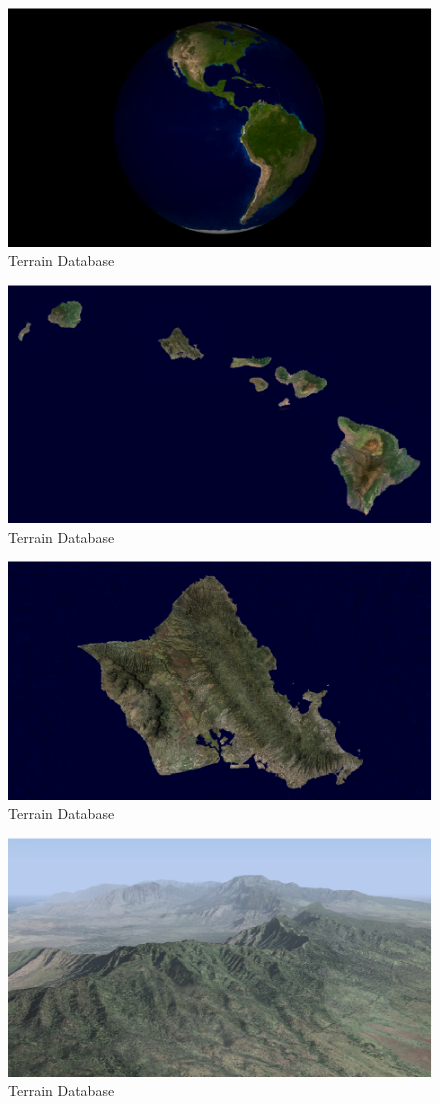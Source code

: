 \begin{figure}
  \centering
  \includegraphics[width=120mm]{eps/vpb_scenery_01.eps}
  \caption{Terrain Database}
\end{figure}

\begin{figure}
  \centering
  \includegraphics[width=120mm]{eps/vpb_scenery_02.eps}
  \caption{Terrain Database}
\end{figure}

\begin{figure}
  \centering
  \includegraphics[width=120mm]{eps/vpb_scenery_03.eps}
  \caption{Terrain Database}
\end{figure}

\begin{figure}
  \centering
  \includegraphics[width=120mm]{eps/vpb_scenery_04.eps}
  \caption{Terrain Database}
\end{figure}
